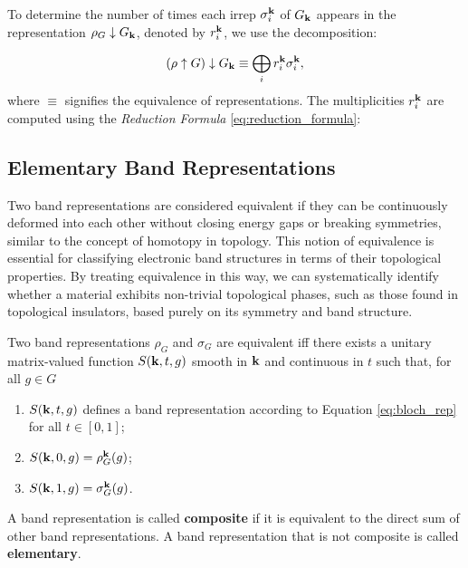 To determine the number of times each irrep \(\sigma_i^{\vb{k}}\) of \(G_{\vb{k}}\) appears in the representation \(\rho_G \downarrow G_{\vb{k}}\), denoted by \(r_i^{\vb{k}}\), we use the decomposition:

\begin{equation} \label{eq:induce_subduce}
(\rho \uparrow G) \downarrow G_{\vb{k}} \equiv \bigoplus_i r_i^{\vb{k}} \sigma_i^{\vb{k}},
\end{equation}
where \(\equiv\) signifies the equivalence of representations. The multiplicities \(r_i^{\vb{k}}\) are computed using the \textit{Reduction Formula} \ref{eq:reduction_formula}:

\subsection{Elementary Band Representations}

Two band representations are considered equivalent if they can be continuously deformed into each other without closing energy gaps or breaking symmetries, similar to the concept of homotopy in topology. This notion of equivalence is essential for classifying electronic band structures in terms of their topological properties. By treating equivalence in this way, we can systematically identify whether a material exhibits non-trivial topological phases, such as those found in topological insulators, based purely on its symmetry and band structure.

\begin{definition} \label{def:equiv_bandrep}
Two band representations $\rho_G$ and $\sigma_G$ are equivalent iff there exists a unitary matrix-valued function $S({\vb{k}},t,g)$ smooth in ${\vb{k}}$ and continuous in $t$ such that, for all $g \in G$
\begin{enumerate}
\item $S({\vb{k}}, t, g)$ defines a band representation according to Equation \ref{eq:bloch_rep} for all $t \in [0,1]$;
\item $S({\vb{k}}, 0, g) = \rho_G^{\vb{k}}(g)$;
\item $S({\vb{k}}, 1, g) = \sigma_G^{\vb{k}}(g)$.
\end{enumerate}
\end{definition}

\begin{definition}
A band representation is called \textbf{composite} if it is equivalent to the direct sum of other band representations. A band representation that is not composite is called \textbf{elementary}.
\end{definition}

